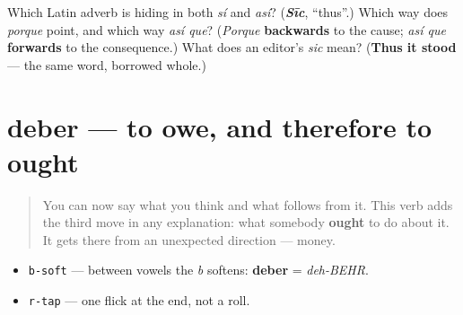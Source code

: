 \begin{tcolorbox}[breakable,colback=teal!4,colframe=teal!35!black,title={Before you move on}]
Which Latin adverb is hiding in both \emph{sí} and \emph{así}? (\emph{\textbf{Sīc}}, \textquotedblleft{}thus\textquotedblright{}.) Which way does \emph{porque} point, and which way \emph{así que}? (\emph{Porque} \textbf{backwards} to the cause; \emph{así que} \textbf{forwards} to the consequence.) What does an editor's \emph{sic} mean? (\textbf{Thus it stood} — the same word, borrowed whole.)
\end{tcolorbox}
\section[deber]{deber — to owe, and therefore to ought}

\label{lesson:ES-C41-deber}



\begin{quote}
You can now say what you think and what follows from it. This verb adds the third move in any explanation: what somebody \textbf{ought} to do about it. It gets there from an unexpected direction — money.
\end{quote}

\begin{sounds}
\begin{itemize}
\raggedright
  \item \texttt{b-soft} — between vowels the \emph{b} softens: \textbf{deber} = \emph{deh-BEHR}.
  \item \texttt{r-tap} — one flick at the end, not a roll.
\end{itemize}
\end{sounds}

